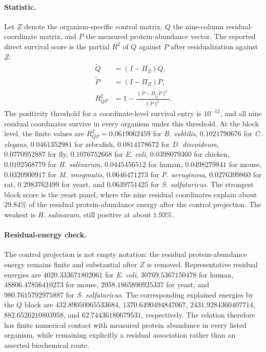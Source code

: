 \paragraph{Statistic.}
Let $Z$ denote the organism-specific control matrix, $Q$ the nine-column residual-coordinate matrix, and $P$ the measured protein-abundance vector.  The reported direct survival score is the partial $R^2$ of $Q$ against $P$ after residualization against $Z$:
$$
\begin{aligned}
\widetilde Q &= (I-\Pi_Z)Q,\\
\widetilde P &= (I-\Pi_Z)P,\\
R^2_{QP} &= 1 - \frac{\|\widetilde P-\Pi_{\widetilde Q}\widetilde P\|^2}{\|\widetilde P\|^2}.
\end{aligned}
$$
The positivity threshold for a coordinate-level survival entry is $10^{-12}$, and all nine residual coordinates survive in every organism under this threshold.  At the block level, the finite values are $R^2_{QP}=0.0619062459$ for \emph{B. subtilis}, $0.1021790676$ for \emph{C. elegans}, $0.0461352981$ for zebrafish, $0.0814178672$ for \emph{D. discoideum}, $0.0770952887$ for fly, $0.1076752668$ for \emph{E. coli}, $0.0398079360$ for chicken, $0.0192568779$ for \emph{H. salinarum}, $0.0445456512$ for human, $0.0498279841$ for mouse, $0.0320900917$ for \emph{M. smegmatis}, $0.0646471273$ for \emph{P. aeruginosa}, $0.0276399860$ for rat, $0.2983762499$ for yeast, and $0.0639751425$ for \emph{S. solfataricus}.  The strongest block score is the yeast panel, where the nine residual coordinates explain about $29.84\%$ of the residual protein-abundance energy after the control projection.  The weakest is \emph{H. salinarum}, still positive at about $1.93\%$.

\paragraph{Residual-energy check.}
The control projection is not empty notation: the residual protein-abundance energy remains finite and substantial after $Z$ is removed.  Representative residual energies are $4020.333671802061$ for \emph{E. coli}, $30769.5367150478$ for human, $48806.47856410273$ for mouse, $2958.1865890925337$ for yeast, and $980.7615792975887$ for \emph{S. solfataricus}.  The corresponding explained energies by the $Q$ block are $432.89050065533684$, $1370.6490494847067$, $2431.9284360407714$, $882.6526210803958$, and $62.74436180679531$, respectively.  The relation therefore has finite numerical contact with measured protein abundance in every listed organism, while remaining explicitly a residual association rather than an asserted biochemical route.

